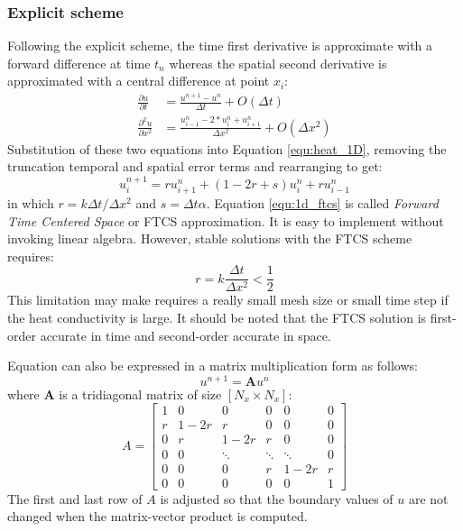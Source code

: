 \subsubsection{Explicit scheme}
Following the explicit scheme, the time first derivative is approximate with a forward difference at time $t_n$ whereas the spatial second derivative is approximated with a central difference at point $x_i$:
\begin{align}
	\frac{\partial u}{\partial t} &= \frac{u^{n+1} - u^{n}}{\Delta t} + O(\Delta t) \\
	\frac{\partial^2 u}{\partial x^2} &= \frac{u^{n}_{i-1} - 2*u^{n}_{i} + u^{n}_{i+1}}{\Delta x^2} + O(\Delta x^2)	
\end{align}
Substitution of these two equations into Equation \ref{equ:heat_1D}, removing the truncation temporal and spatial error terms and rearranging to get:
\begin{equation}
	u^{n+1}_i = r u^{n}_{i+1} + (1-2r+s) u^{n}_{i} + r u^{n}_{i-1}
	\label{equ:1d_ftcs}
\end{equation}
in which $r = k \Delta t / \Delta x^2$ and $s = \Delta t \alpha$. Equation \ref{equ:1d_ftcs} is called \textit{Forward Time Centered Space} or FTCS approximation. It is easy to implement without invoking linear algebra. However, stable solutions with the FTCS scheme requires:
\begin{equation}
	r = k \frac{\Delta t}{\Delta x^2} < \frac{1}{2}
\end{equation}
This limitation may make requires a really small mesh size or small time step if the heat conductivity is large. It should be noted that the FTCS solution is first-order accurate in time and second-order accurate in space.

Equation can also be expressed in a matrix multiplication form as follows:
\begin{equation}
	u^{n+1} = \mathbf{A} u^{n}
\end{equation}
where $\mathbf{A}$ is a tridiagonal matrix of size $[N_x \times N_x]$:
\begin{equation}
A = 
\begin{bmatrix}
	1 & 0    & 0      & 0      & 0      & 0 \\
	r & 1-2r & r      & 0      & 0      & 0 \\
	0 & r    & 1-2r   & r      & 0      & 0 \\
	0 & 0    & \ddots & \ddots & \ddots & 0 \\
	0 & 0    & 0      & r      & 1-2r   & r \\
	0 & 0    & 0      & 0      & 0      & 1
\end{bmatrix}
\end{equation}
The first and last row of $A$ is adjusted so that the boundary values of $u$ are not changed when the matrix-vector product is computed. 


